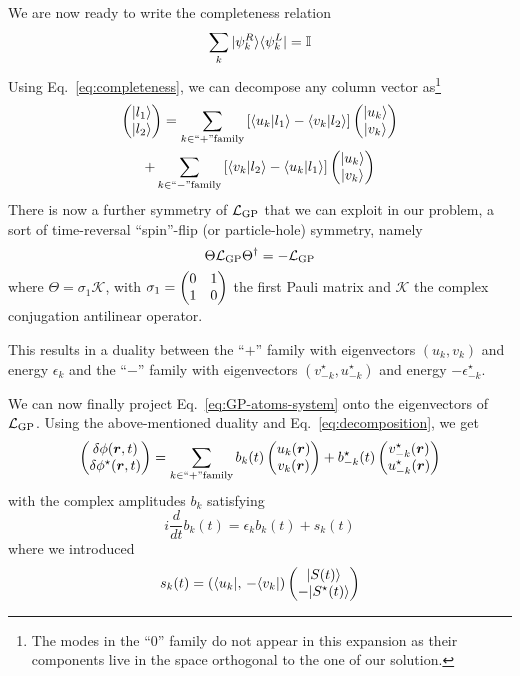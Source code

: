 
We are now ready to write the completeness relation
%
\begin{equation}\label{eq:completeness}
  \sum_k \vert \psi_k^R \rangle \langle \psi_k^L \vert = \mathbb{I}
\end{equation}
% 
Using Eq.~\eqref{eq:completeness}, we can decompose any column vector
as\footnote{The modes in the ``$0$'' family do not appear in this
  expansion as their components live in the space orthogonal to the one
  of our solution.}
%
\begin{multline}\label{eq:decomposition}
  \begin{pmatrix} \vert l_1 \rangle\\ \vert l_2 \rangle \end{pmatrix} = \sum_{k \in ``+" \mbox{\scriptsize family}} \left[\langle u_k \vert l_1 \rangle - \langle v_k \vert l_2 \rangle\right]\begin{pmatrix} \vert u_k \rangle\\ \vert v_k \rangle \end{pmatrix}\\
  + \sum_{k \in ``-" \mbox{\scriptsize family}} \left[\langle v_k \vert l_2 \rangle - \langle u_k \vert l_1 \rangle\right]\begin{pmatrix} \vert u_k \rangle\\ \vert v_k \rangle \end{pmatrix}
\end{multline}
% 
There is now a further symmetry of $\mathcal{L}_{\text{GP}}$ that we can
exploit in our problem, a sort of time-reversal ``spin''-flip (or
particle-hole) symmetry, namely
%
\begin{equation}\label{eq:symmetry-2}
   \Theta \mathcal{L}_{\text{GP}} \Theta^{\dagger} = -\mathcal{L}_{\text{GP}}
\end{equation}
%
where $\Theta = \sigma_1 \mathcal{K}$, with $\sigma_1 = \begin{pmatrix} 0 & 1\\ 1 & 0 \end{pmatrix}$
the first Pauli matrix and $\mathcal{K}$ the complex conjugation
antilinear operator.

This results in a duality between the ``$+$'' family with eigenvectors
$(u_k, v_k)$ and energy $\epsilon_k$ and the ``$-$'' family with
eigenvectors $(v_{-k}^{\star}, u_{-k}^{\star})$ and energy
$-\epsilon_{-k}^{\star}$.

We can now finally project Eq.~\eqref{eq:GP-atoms-system} onto the
eigenvectors of $\mathcal{L}_{\text{GP}}$. Using the above-mentioned duality and
Eq.~\eqref{eq:decomposition}, we get
%
\begin{equation}\label{eq:phi-column-expansion}
  \begin{pmatrix} \delta\phi(\bm{r},t)\\ \delta\phi^{\star}(\bm{r},t) \end{pmatrix} = \sum_{k \in ``+" \mbox{\scriptsize family}}
  b_k(t) \begin{pmatrix} u_k(\bm{r})\\ v_k(\bm{r}) \end{pmatrix}
  + b_{-k}^{\star}(t) \begin{pmatrix} v_{-k}^{\star}(\bm{r})\\ u_{-k}^{\star}(\bm{r}) \end{pmatrix}
\end{equation}
% 
with the complex amplitudes $b_k$ satisfying 
%
\begin{equation}\label{eq:amplitudes-bk}
  i \frac{d}{dt}b_k(t) = \epsilon_k b_k(t) + s_k(t)
\end{equation}
% 
where we introduced
%
\begin{equation}\label{eq:amplitudes-sk}
  s_k(t) = \left( \langle u_k \vert ,\, -\langle v_k \vert \right) \begin{pmatrix} \vert S(t) \rangle\\ -\vert S^{\star}(t) \rangle \end{pmatrix}
\end{equation}
% 

